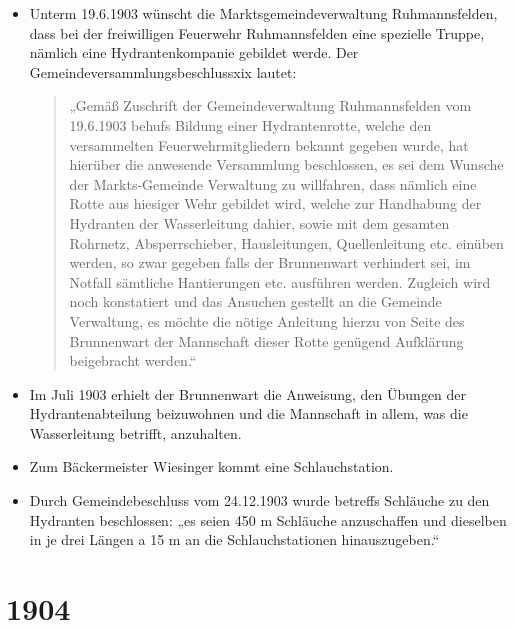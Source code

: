 \documentclass[12pt,a4paper]{book}
\begin{document}
\begin{itemize}
\item Unterm 19.6.1903 wünscht die Marktsgemeindeverwaltung Ruhmannsfelden, dass
bei der freiwilligen Feuerwehr Ruhmannsfelden eine spezielle Truppe, nämlich
eine Hydrantenkompanie gebildet werde. Der Gemeindeversammlungsbeschlussxix
lautet:

\begin{quote}
„Gemäß Zuschrift der Gemeindeverwaltung Ruhmannsfelden vom 19.6.1903 behufs
Bildung einer Hydrantenrotte, welche den versammelten Feuerwehrmitgliedern
bekannt gegeben wurde, hat hierüber die anwesende Versammlung beschlossen, es
sei dem Wunsche der Markts-Gemeinde Verwaltung zu willfahren, dass nämlich eine
Rotte aus hiesiger Wehr gebildet wird, welche zur Handhabung der Hydranten der
Wasserleitung dahier, sowie mit dem gesamten Rohrnetz, Absperrschieber,
Hausleitungen, Quellenleitung etc. einüben werden, so zwar gegeben falls der
Brunnenwart verhindert sei, im Notfall sämtliche Hantierungen etc. ausführen
werden. Zugleich wird noch konstatiert und das Ansuchen gestellt an die Gemeinde
Verwaltung, es möchte die nötige Anleitung hierzu von Seite des Brunnenwart der
Mannschaft dieser Rotte genügend Aufklärung beigebracht werden.“
\end{quote}

\item Im Juli 1903 erhielt der Brunnenwart die Anweisung, den Übungen der
Hydrantenabteilung beizuwohnen und die Mannschaft in allem, was die
Wasserleitung betrifft, anzuhalten.

\item Zum Bäckermeister Wiesinger kommt eine Schlauchstation.

\item Durch Gemeindebeschluss vom 24.12.1903 wurde betreffs Schläuche zu den
Hydranten beschlossen: „es seien 450 m Schläuche anzuschaffen und dieselben in
je drei Längen a 15 m an die Schlauchstationen hinauszugeben.“
\end{itemize}

\section*{1904}
\end{document}

